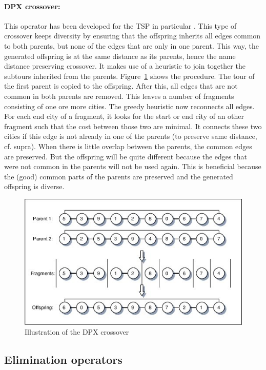 \documentclass[a4paper,10pt]{article}
\begin{document}
\paragraph{DPX crossover:} This operator has been developed for the TSP in particular \cite{dpxcrossover}. This type of crossover keeps diversity by ensuring that the offspring inherits all edges common to both parents, but none of the edges that are only in one parent. This way, the generated offspring is at the same distance as its parents, hence the name distance preserving crossover. It makes use of a heuristic to join together the subtours inherited from the parents. Figure~\ref{fig:dpxcrossover} shows the procedure. The tour of the first parent is copied to the offspring. After this, all edges that are not common in both parents are removed. This leaves a number of fragments consisting of one ore more cities. The greedy heuristic now reconnects all edges. For each end city of a fragment, it looks for the start or end city of an other fragment such that the cost between those two are minimal. It connects these two cities if this edge is not already in one of the parents (to preserve same distance, cf. supra).
When there is little overlap between the parents, the common edges are preserved. But the offspring will be quite different because the edges that were not common in the parents will not be used again. This is beneficial because the (good) common parts of the parents are preserved and the generated offspring is diverse. 

\begin{figure}[H]
  \centering
  \includegraphics[width=.6\textwidth]{img/dpxcrossover.jpg}
  \caption{Illustration of the DPX crossover \cite{dpxcrossover} }
  \label{fig:dpxcrossover}
\end{figure}


\subsection{Elimination operators}\label{ssec:elimination}
\end{document}
